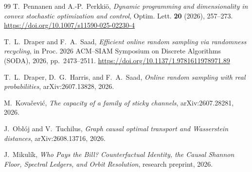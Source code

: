 \documentclass[11pt,a4paper]{article}
\theoremstyle{definition}
\theoremstyle{remark}
\begin{document}
\begin{thebibliography}{99}
T.~Pennanen and A.-P.~Perkki\"o,
\emph{Dynamic programming and dimensionality in convex stochastic optimization
and control},
Optim. Lett. \textbf{20} (2026), 257--273.
\url{https://doi.org/10.1007/s11590-025-02230-4}

T.~L.~Draper and F.~A.~Saad,
\emph{Efficient online random sampling via randomness recycling},
in Proc. 2026 ACM--SIAM Symposium on Discrete Algorithms (SODA),
2026, pp.~2473--2511.
\url{https://doi.org/10.1137/1.9781611978971.89}

T.~L.~Draper, D.~G.~Harris, and F.~A.~Saad,
\emph{Online random sampling with real probabilities},
arXiv:2607.13828, 2026.

M.~Kova\v{c}evi\'c,
\emph{The capacity of a family of sticky channels},
arXiv:2607.28281, 2026.

J.~Ob\l\'oj and V.~Tuchilus,
\emph{Graph causal optimal transport and Wasserstein distances},
arXiv:2608.13716, 2026.

J.~Mikul\'ik,
\emph{Who Pays the Bill? Counterfactual Identity, the Causal Shannon Floor,
Spectral Ledgers, and Orbit Resolution},
research preprint, 2026.

\end{thebibliography}
\end{document}
